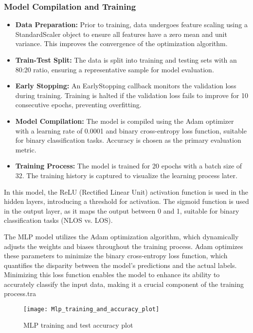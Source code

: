 \documentclass[
	article, %
	11pt, %
	draft, %
]{CSUniSchoolLabReport}
\begin{document}
\subsubsection{Model Compilation and Training}

\begin{itemize}
    \item \textbf{Data Preparation:} Prior to training, data undergoes feature scaling using a StandardScaler object to ensure all features have a zero mean and unit variance. This improves the convergence of the optimization algorithm.
    \item \textbf{Train-Test Split:} The data is split into training and testing sets with an 80:20 ratio, ensuring a representative sample for model evaluation.
    \item \textbf{Early Stopping:} An EarlyStopping callback monitors the validation loss during training. Training is halted if the validation loss fails to improve for 10 consecutive epochs, preventing overfitting.
    \item \textbf{Model Compilation:} The model is compiled using the Adam optimizer with a learning rate of 0.0001 and binary cross-entropy loss function, suitable for binary classification tasks. Accuracy is chosen as the primary evaluation metric.
    \item \textbf{Training Process:} The model is trained for 20 epochs with a batch size of 32. The training history is captured to visualize the learning process later.
\end{itemize}

In this model, the ReLU (Rectified Linear Unit) activation function is used in the hidden layers, introducing a threshold for activation. The sigmoid function is used in the output layer, as it maps the output between 0 and 1, suitable for binary classification tasks (NLOS vs. LOS).

The MLP model utilizes the Adam optimization algorithm, which dynamically adjusts the weights and biases throughout the training process. Adam optimizes these parameters to minimize the binary cross-entropy loss function, which quantifies the disparity between the model's predictions and the actual labels. Minimizing this loss function enables the model to enhance its ability to accurately classify the input data, making it a crucial component of the training process.tra

\begin{figure}[H] 
	\centering
	\texttt{[image: Mlp\_training\_and\_accuracy\_plot]}
	\caption{MLP training and test accuracy plot}\label{fig:mlp_training_and_accuracy_plot}
\end{figure}
\end{document}
